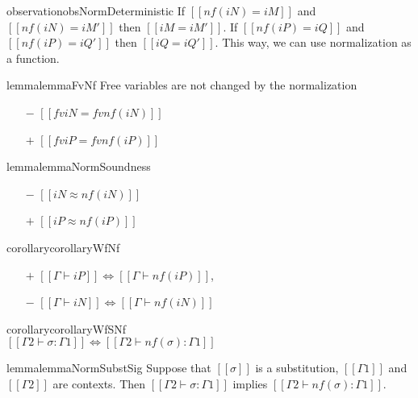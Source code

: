 \begin{restatable}{observation}{obsNormDeterministic}
    \label{obs:norm-deterministic}
    If $[[nf(iN) = iM]]$ and $[[nf(iN) = iM']]$ then $[[iM = iM']]$.
    If $[[nf(iP) = iQ]]$ and $[[nf(iP) = iQ']]$ then $[[iQ = iQ']]$.
    This way, we can use normalization as a function.
\end{restatable}


\begin{restatable}{lemma}{lemmaFvNf}
    \label{lemma:fv-nf}
    Free variables are not changed by the normalization
    \begin{itemize}
    \item[$-$] $[[fv iN = fv nf(iN)]]$
    \item[$+$] $[[fv iP = fv nf(iP)]]$
    \end{itemize}
\end{restatable}


\begin{restatable}{lemma}{lemmaNormSoundness}
    \label{lemma:normalization-soundness}
    \hfill
    \begin{itemize}
        \item[$-$] $[[iN ≈ nf(iN)]]$
        \item[$+$] $[[iP ≈ nf(iP)]]$
    \end{itemize}
\end{restatable}

\begin{restatable}{corollary}{corollaryWfNf}
    \label{corollary:wf-nf}
    \hfill
    \begin{itemize}
    \item[$+$] $[[Γ ⊢ iP]] \iff [[Γ ⊢ nf(iP)]]$,
    \item[$-$] $[[Γ ⊢ iN]] \iff [[Γ ⊢ nf(iN)]]$
    \end{itemize}
\end{restatable}

\begin{restatable}{corollary}{corollaryWfSNf}
    \label{corollary:wf-s-nf}
    \hfill \\
     $[[Γ2 ⊢ σ : Γ1]] \iff [[Γ2 ⊢ nf(σ) : Γ1]]$
\end{restatable}

\begin{restatable}{lemma}{lemmaNormSubstSig}
    \label{lemma:norm-subst-sig}
    Suppose that $[[σ]]$ is a substitution, $[[Γ1]]$ and $[[Γ2]]$ are contexts.
    Then $[[Γ2 ⊢ σ : Γ1]]$ implies $[[Γ2 ⊢ nf(σ) : Γ1]]$.
\end{restatable}


